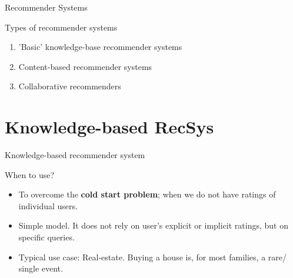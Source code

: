 \documentclass[compress]{beamer}
\begin{document}
\begin{frame}{Recommender Systems} 
	\begin{block}{Types of recommender systems  \parencite{Wieland2021, Locherbach2018, Moller2018}}
\begin{enumerate}
	\item 'Basic' knowledge-base recommender systems
	\item Content-based recommender systems
	\item Collaborative  recommenders 
\end{enumerate}
	\end{block}{\tiny }
\end{frame}

\section{Knowledge-based RecSys}
\begin{frame}{Knowledge-based recommender system} 
	\begin{block}{When to use?}
		\begin{itemize}
			\item<2-> To overcome the \textbf{cold start problem}; when we do not have ratings of individual users. 
			\item<3-> Simple model. It does not rely on user's explicit or implicit ratings, but on specific queries.
			\item<4-> Typical use case: Real-estate. Buying a house is, for most families, a rare/ single event. 
		\end{itemize}
	\end{block}
\end{frame}



\begin{frame}
\end{frame}
\end{document}

